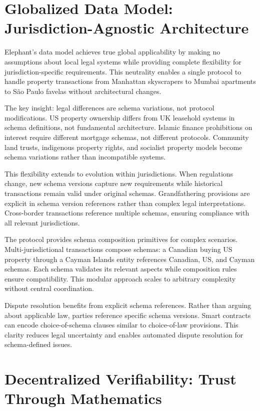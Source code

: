 \section{Globalized Data Model: Jurisdiction-Agnostic Architecture}

Elephant's data model achieves true global applicability by making no assumptions about local legal systems while providing complete flexibility for jurisdiction-specific requirements. This neutrality enables a single protocol to handle property transactions from Manhattan skyscrapers to Mumbai apartments to São Paulo favelas without architectural changes.

The key insight: legal differences are schema variations, not protocol modifications. US property ownership differs from UK leasehold systems in schema definitions, not fundamental architecture. Islamic finance prohibitions on interest require different mortgage schemas, not different protocols. Community land trusts, indigenous property rights, and socialist property models become schema variations rather than incompatible systems.

This flexibility extends to evolution within jurisdictions. When regulations change, new schema versions capture new requirements while historical transactions remain valid under original schemas. Grandfathering provisions are explicit in schema version references rather than complex legal interpretations. Cross-border transactions reference multiple schemas, ensuring compliance with all relevant jurisdictions.

The protocol provides schema composition primitives for complex scenarios. Multi-jurisdictional transactions compose schemas: a Canadian buying US property through a Cayman Islands entity references Canadian, US, and Cayman schemas. Each schema validates its relevant aspects while composition rules ensure compatibility. This modular approach scales to arbitrary complexity without central coordination.

Dispute resolution benefits from explicit schema references. Rather than arguing about applicable law, parties reference specific schema versions. Smart contracts can encode choice-of-schema clauses similar to choice-of-law provisions. This clarity reduces legal uncertainty and enables automated dispute resolution for schema-defined issues.

\section{Decentralized Verifiability: Trust Through Mathematics}

